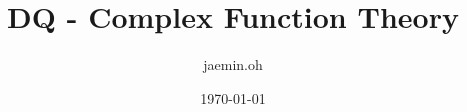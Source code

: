 \documentclass{amsart}
\date{\today}
\begin{document}
\author{jaemin.oh}
\title{DQ - Complex Function Theory}

\maketitle


\end{document}
